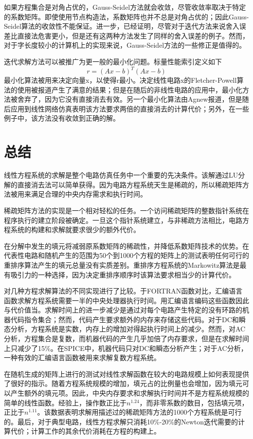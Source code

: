 如果方程集合是对角占优的，Gauss-Seidel方法就会收敛，尽管收敛率取决于特定的系数矩阵。即使使用节点构造法，系数矩阵也并不总是对角占优的；因此Gauss-Seidel算法的收敛性不能保证。进一步，已经证明，尽管对于迭代方法来说舍入误差比直接法危害更小，但是还有这两种方法发生了同样的舍入误差的例子\cite{ref-49}。然而，对于字长度较小的计算机上的实现来说，Gauss-Seidel方法的一些修正是值得的。

迭代求解方法可以被推广为更一般的最小化问题。标量性能索引定义如下
\begin{equation}
    r = (Ax-b)^T(Ax-b)
    \label{eq:4.23}
\end{equation}
最小化算法被用来决定向量x，以使得r最小。决定线性电路x的Fletcher-Powell算法\cite{ref-54}的使用被报道产生了满意的结果\cite{ref-48}；但是在随后的非线性电路的应用中，最小化方法被舍弃了，因为它没有直接消去有效。另一个最小化算法由Agnew\cite{ref-55}报道，但是随后应用到线性网络仿真\cite{ref-55}表明该方法要求两倍的直接消去的计算代价；另外，在一些例子中，该方法没有收敛到正确的解。

\section{总结}
线性方程系统的求解是整个电路仿真任务中一个重要的先决条件。该解通过LU分解的直接消去法可以简单获得。因为电路方程系统天生是稀疏的，所以稀疏矩阵方法被用来满足合理的中央内存需求和执行时间。

稀疏矩阵方法的实现是一个相对轻松的任务。一个访问稀疏矩阵的整数指针系统在程序执行的建立阶段被确定。一旦这个指针系统建立，与非稀疏方法相比，电路方程系统的构建和求解就要求很少的额外代价。

在分解中发生的填元将减弱原系数矩阵的稀疏性，并降低系数矩阵技术的优势。在代表性电路和随机产生的范围为50个到1000个方程的矩阵上的测试表明任何可行的重排序算法产生的填元总量没有实质差别。重排序方程系统的Markowitz算法是最有吸引力的一种选择，因为决定重排序顺序时该算法要求相当少的计算代价。

对几种方程求解算法的不同实现进行了比较。于FORTRAN函数对比，汇编语言函数求解方程系统需要一半的中央处理器执行时间。用汇编语言编码这些函数因此与代价值当。求解时间上的进一步减少是通过对每个电路产生特定的没有环路的机器代码指令集合；然而，代码产生要求额外的内存来存储这些代码。对于DC和瞬态分析，方程系统是实数，内存上的增加对得起执行时间上的减少。然而，对AC分析，方程集合是复数，而机器代码的产生几乎加倍了内存要求，但是在求解时间上只减少了15\%。在SPICE中，机器代码只对DC和瞬态分析产生；对于AC分析，一种有效的汇编语言函数被用来求解复数方程系统。

在随机生成的矩阵上进行的测试对线性求解函数在较大的电路规模上如何表现提供了很好的指示。随着方程系统规模的增加，填元占的比例量也会增加，因为填元可以产生额外的填元项。因此，中央内存要求和求解执行时间并不是方程系统规模的简单的线性函数。经验上，操作数正比于$n^{1.24}$，而非零系数的数目，包括填元项，正比于$n^{1.11}$。该数据表明求解用描述过的稀疏矩阵方法的1000个方程系统是可行的。最后，对于典型电路，线性方程求解只消耗10\%-20\%的Newton迭代需要的计算代价；计算工作的其余代价消耗在方程的构建上。
